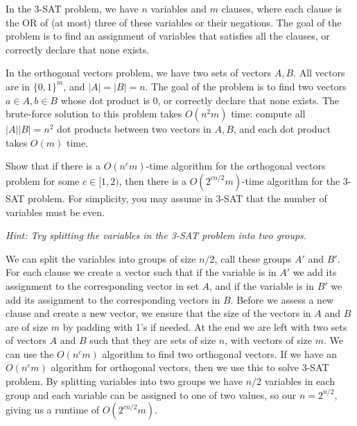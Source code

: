 \documentclass[11pt]{article}
\begin{document}
In the 3-SAT problem, we have $n$ variables and $m$ clauses, where each clause is the OR of (at most) three of these variables or their negations. The goal of the problem is to find an assignment of variables that satisfies all the clauses, or correctly declare that none exists.

\noindent In the orthogonal vectors problem, we have two sets of vectors $A, B$. All vectors are in $\{0, 1\}^m$, and $|A|=|B|=n$. The goal of the problem is to find two vectors $a \in A, b \in B$ whose dot product is 0, or correctly declare that none exists. The brute-force solution to this problem takes $O(n^2 m)$ time: compute all $|A||B| = n^2$ dot products between two vectors in $A, B$, and each dot product takes $O(m)$ time.

\noindent Show that if there is a $O(n^c m)$-time algorithm for the orthogonal vectors problem for some $c \in [1, 2)$, then there is a $O(2^{cn/2} m)$-time algorithm for the 3-SAT problem. For simplicity, you may assume in 3-SAT that the number of variables must be even. 

\noindent \textit{Hint: Try splitting the variables in the 3-SAT problem into two groups.}\\
\begin{solution}
    We can split the variables into groups of size $n/2$, call these groups $A'$ and $B'$. For each clause we create a vector such that if the variable is 
    in $A'$ we add its assignment to the corresponding vector in set $A$, and if the variable is in $B'$ we add its assignment to the corresponding vectors in $B$. Before we assess a
    new clause and create a new vector, we ensure that the size of the vectors in $A$ and $B$ are of size $m$ by padding with 1's if needed. At the end we are left with two sets of vectors
    $A$ and $B$ such that they are sets of size $n$, with vectors of size $m$. We can use the $O(n^cm)$ algorithm to find two orthogonal vectors. If we have an $O(n^cm)$ algorithm for orthogonal vectors, then we 
    use this to solve 3-SAT problem. By splitting variables into two groups we have $n/2$ variables in each group and each variable can be assigned to one of two values, so our $n=2^{n/2}$, giving us a
    runtime of $O(2^{cn/2}m)$.
\end{solution}
\newpage
\end{document}
